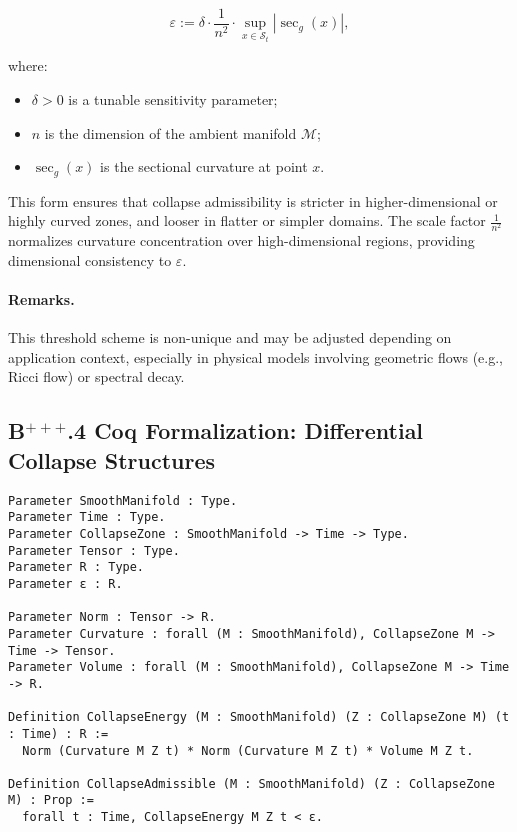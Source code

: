 \documentclass[11pt]{article}
\begin{document}
\[
\varepsilon := \delta \cdot \frac{1}{n^2} \cdot \sup_{x \in \mathcal{S}_t} |\sec_g(x)|,
\]

where:
\begin{itemize}
  \item \( \delta > 0 \) is a tunable sensitivity parameter;
  \item \( n \) is the dimension of the ambient manifold \( \mathcal{M} \);
  \item \( \sec_g(x) \) is the sectional curvature at point \( x \).
\end{itemize}

This form ensures that collapse admissibility is stricter in higher-dimensional or highly curved zones, and looser in flatter or simpler domains. The scale factor \( \frac{1}{n^2} \) normalizes curvature concentration over high-dimensional regions, providing dimensional consistency to \( \varepsilon \).

\paragraph{Remarks.}
This threshold scheme is non-unique and may be adjusted depending on application context, especially in physical models involving geometric flows (e.g., Ricci flow) or spectral decay.


\subsection*{B$^{+++}$.4 Coq Formalization: Differential Collapse Structures}

\begin{lstlisting}[language=Coq, caption={Differential Collapse Structures in Coq}]
Parameter SmoothManifold : Type.
Parameter Time : Type.
Parameter CollapseZone : SmoothManifold -> Time -> Type.
Parameter Tensor : Type.
Parameter R : Type.
Parameter ε : R.

Parameter Norm : Tensor -> R.
Parameter Curvature : forall (M : SmoothManifold), CollapseZone M -> Time -> Tensor.
Parameter Volume : forall (M : SmoothManifold), CollapseZone M -> Time -> R.

Definition CollapseEnergy (M : SmoothManifold) (Z : CollapseZone M) (t : Time) : R :=
  Norm (Curvature M Z t) * Norm (Curvature M Z t) * Volume M Z t.

Definition CollapseAdmissible (M : SmoothManifold) (Z : CollapseZone M) : Prop :=
  forall t : Time, CollapseEnergy M Z t < ε.
\end{lstlisting}
\end{document}
